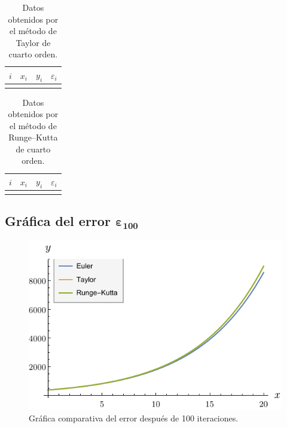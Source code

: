 \documentclass[
    english, spanish, Ce-table, Ce-theorem
]{CabesHW}
\begin{document}
\begin{table}[H]
    \centering
    \begin{tabular}{c|ccc}
    $i$ & $x_i$ & $y_i$ & $\varepsilon_i$\\[.1em]
    \hline\\[-.9em]
    
    \end{tabular}
    \caption{Datos obtenidos por el método de Taylor de cuarto orden.}
    \label{tab:taylor}
\end{table}

\begin{table}[H]
    \centering
    \begin{tabular}{c|ccc}
    $i$ & $x_i$ & $y_i$ & $\varepsilon_i$\\[.1em]
    \hline\\[-.9em]
    
    \end{tabular}
    \caption{Datos obtenidos por el método de Runge--Kutta de cuarto orden.}
    \label{tab:runge-kutta}
\end{table}

\vspace{1em}
\subsection[Gráfica del error después de 100 iteraciones]{Gráfica del error $\boldsymbol{\varepsilon_{100}}$}
\begin{figure}[H]
    \centering
    \includegraphics{imgs/plot-comp.pdf}
    \caption{Gráfica comparativa del error después de 100 iteraciones.}
    \label{fig:comp}
\end{figure}
\end{document}
